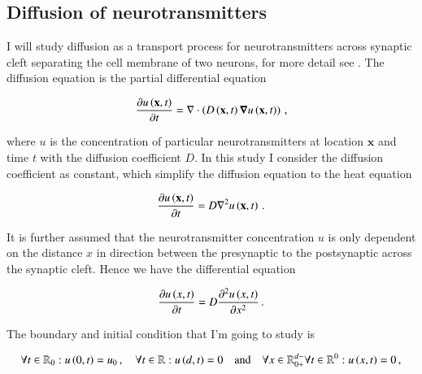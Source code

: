 \documentclass[11pt,english,a4paper]{article}
\begin{document}
\maketitle
\begin{flushleft}

\begin{abstract}

\end{abstract}

\section{Diffusion of neurotransmitters}

I will study diffusion as a transport process for neurotransmitters  across synaptic cleft separating the cell membrane of two neurons, for more detail see \cite{project4}. The diffusion equation is the partial differential equation 

\begin{align*}
\frac{\partial u\left({\textbf{x},t}\right)}{\partial t} = \nabla \cdot\left({D\left({\textbf{x},t}\right)\boldsymbol{\nabla} u\left({\textbf{x},t}\right)}\right)\,,
\end{align*}

where $u$ is the concentration of particular neurotransmitters at location $\textbf{x}$ and time $t$ with the diffusion coefficient $D$. In this study I consider the diffusion coefficient as constant, which simplify the diffusion equation to the heat equation

\begin{align*}
\frac{\partial u\left({\textbf{x},t}\right)}{\partial t} = D\nabla^2 u\left({\textbf{x},t}\right)\,.
\end{align*}

It is further assumed that the neurotransmitter concentration $u$ is only dependent on the distance $x$ in direction between the presynaptic to the postsynaptic across the synaptic cleft. Hence we have the differential equation

\begin{align}
\frac{\partial u\left({x,t}\right)}{\partial t} = D\frac{\partial^2 u\left({x,t}\right)}{\partial x^2}\,.
\label{eq_1}
\end{align}

The boundary and initial condition that I'm going to study is 

\begin{align}
\forall t \in\mathbb{R}_{0}: u\left({0,t}\right) = u_0\,, \quad \forall  t\in\mathbb{R} : u\left({d, t}\right) = 0 \quad \text{and} \quad \forall x\in\mathbb{R}_{0+}^{d-} \forall t \in \mathbb{R}^{0}:u\left({x,t}\right)=0\,,
\label{eq_2}
\end{align}


\end{flushleft}
\end{document}
